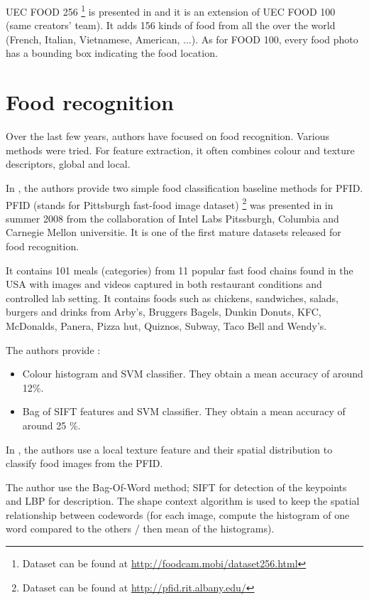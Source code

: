 UEC FOOD 256 \footnote{Dataset can be found at \url{http://foodcam.mobi/dataset256.html}} is presented in \cite{Kawano2015} and it is an extension of UEC FOOD 100 (same creators' team). It adds 156 kinds of food from all the over the world (French, Italian, Vietnamese, American, ...). As for FOOD 100, every food photo has a bounding box indicating the food location.

\section{Food recognition}

%
%

Over the last few years, authors have focused on food recognition. Various methods were tried. For feature extraction, it often combines colour and texture descriptors, global and local.

In \cite{Chen2009}, the authors provide two simple food classification baseline methods for PFID. PFID (stands for Pittsburgh fast-food image dataset) \footnote{Dataset can be found at \url{http://pfid.rit.albany.edu/}} was presented in \cite{Chen2009} in summer 2008 from the collaboration of Intel Labs Pitssburgh, Columbia and Carnegie Mellon universitie. It is one of the first mature datasets released for food recognition.

It contains 101 meals (categories) from 11 popular fast food chains found in the USA with images and videos captured in both restaurant conditions and controlled lab setting. It contains foods such as chickens, sandwiches, salads, burgers and drinks from Arby's, Bruggers Bagels, Dunkin Donuts, KFC, McDonalds, Panera, Pizza hut, Quiznos, Subway, Taco Bell and Wendy's.

The authors provide :
\begin{itemize}
    \item Colour histogram and SVM classifier. They obtain a mean accuracy of around 12\%.
    \item Bag of SIFT features and SVM classifier. They obtain a mean accuracy of around 25 \%.
\end{itemize}

In \cite{Zong2010}, the authors use a local texture feature and their spatial distribution to classify food images from the PFID.

The author use the Bag-Of-Word method; SIFT for detection of the keypoints and LBP for description. The shape context algorithm is used to keep the spatial relationship between codewords (for each image, compute the histogram of one word compared to the others / then mean of the histograms).

